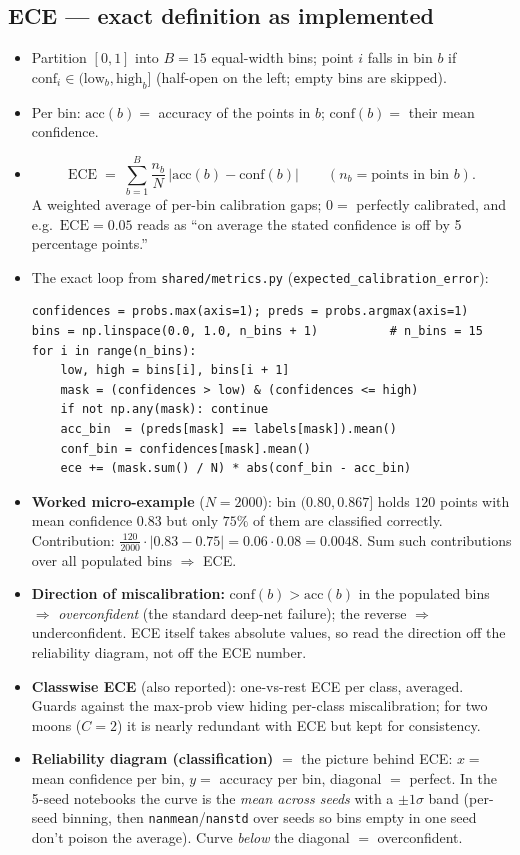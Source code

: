 \documentclass[10pt,a4paper]{article}
\newcommand{\code}[1]{\texttt{#1}}
\begin{document}
\subsection{ECE --- exact definition as implemented}
\begin{itemize}
\item Partition $[0,1]$ into $B=15$ equal-width bins; point $i$ falls in bin $b$ if
  $\mathrm{conf}_i\in(\text{low}_b,\text{high}_b]$ (half-open on the left; empty bins are skipped).
\item Per bin: $\mathrm{acc}(b)=$ accuracy of the points in $b$; $\mathrm{conf}(b)=$ their mean
  confidence.
\item
  \[
  \mathrm{ECE}\;=\;\sum_{b=1}^{B}\frac{n_b}{N}\,\bigl|\mathrm{acc}(b)-\mathrm{conf}(b)\bigr|
  \qquad(n_b=\text{points in bin }b).
  \]
  A weighted average of per-bin calibration gaps; $0=$ perfectly calibrated, and e.g.\
  $\mathrm{ECE}=0.05$ reads as ``on average the stated confidence is off by 5 percentage points.''
\item The exact loop from \code{shared/metrics.py} (\code{expected\_calibration\_error}):
\begin{lstlisting}
confidences = probs.max(axis=1); preds = probs.argmax(axis=1)
bins = np.linspace(0.0, 1.0, n_bins + 1)          # n_bins = 15
for i in range(n_bins):
    low, high = bins[i], bins[i + 1]
    mask = (confidences > low) & (confidences <= high)
    if not np.any(mask): continue
    acc_bin  = (preds[mask] == labels[mask]).mean()
    conf_bin = confidences[mask].mean()
    ece += (mask.sum() / N) * abs(conf_bin - acc_bin)
\end{lstlisting}
\item \textbf{Worked micro-example} ($N=2000$): bin $(0.80,0.867]$ holds $120$ points with mean
  confidence $0.83$ but only $75\%$ of them are classified correctly. Contribution:
  $\frac{120}{2000}\cdot|0.83-0.75|=0.06\cdot0.08=0.0048$. Sum such contributions over all
  populated bins $\Rightarrow$ ECE.
\item \textbf{Direction of miscalibration:} $\mathrm{conf}(b)>\mathrm{acc}(b)$ in the populated bins
  $\Rightarrow$ \emph{overconfident} (the standard deep-net failure); the reverse $\Rightarrow$
  underconfident. ECE itself takes absolute values, so read the direction off the reliability
  diagram, not off the ECE number.
\item \textbf{Classwise ECE} (also reported): one-vs-rest ECE per class, averaged. Guards against
  the max-prob view hiding per-class miscalibration; for two moons ($C=2$) it is nearly redundant
  with ECE but kept for consistency.
\item \textbf{Reliability diagram (classification)} $=$ the picture behind ECE: $x=$ mean
  confidence per bin, $y=$ accuracy per bin, diagonal $=$ perfect. In the 5-seed notebooks the
  curve is the \emph{mean across seeds} with a $\pm1\sigma$ band (per-seed binning, then
  \code{nanmean}/\code{nanstd} over seeds so bins empty in one seed don't poison the average).
  Curve \emph{below} the diagonal $=$ overconfident.
\end{itemize}
\end{document}
